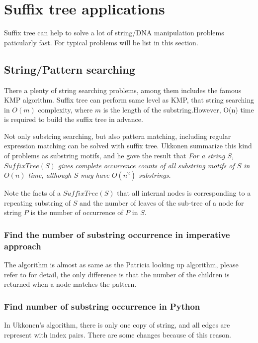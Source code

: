 \documentclass{article}
\begin{document}
\section{Suffix tree applications}

Suffix tree can help to solve a lot of string/DNA manipulation problems
paticularly fast. For typical problems will be list in this section.

\subsection{String/Pattern searching}
\label{substring-lookup}

There a plenty of string searching problems, among them includes the
famous KMP algorithm. Suffix tree can perform same level as 
KMP\cite{zhang-shaojie-lec}, that string searching in $O(m)$ complexity, 
where $m$ is the length of the substring.However, O(n) time is 
required to build the suffix tree in advance\cite{lallison-stree}.

Not only substring searching, but also pattern matching, including
regular expression matching can be solved with suffix tree. Ukkonen
summarize this kind of problems as substring motifs, and he gave the
result that {\em For a string $S$, $SuffixTree(S)$ gives complete occurrence 
counts of all substring motifs of $S$ in $O(n)$ time, although $S$ may have
$O(n^2)$ substrings.}

Note the facts of a $SuffixTree(S)$ that all internal nodes is corresponding
to a repeating substring of $S$ and the number of leaves of the sub-tree of a
node for string $P$ is the number of occurrence of $P$ in $S$.\cite{ukkonen-lec}

\subsubsection{Find the number of substring occurrence in imperative approach}
The algorithm is almost as same as the Patricia looking up algorithm, 
please refer to \cite{lxy-trie} for detail, the only difference is that
the number of the children is returned when a node matches the pattern.

\subsubsection*{Find number of substring occurrence in Python}

In Ukkonen's algorithm, there is only one copy
of string, and all edges are represent with index pairs. There are
some changes because of this reason. 
\end{document}
